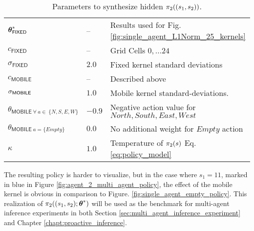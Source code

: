 \begin{table}[H]
	\centering
	\begin{tabular}{l|l l}
		$\boldsymbol{\mathbb{\theta}}^*_{\mathsf{FIXED}}$ & -- & Results used for Fig. \ref{fig:single_agent_L1Norm_25_kernels} \\
		$c_{\mathsf{FIXED}}$ & -- & Grid Cells $0,\ldots 24$ \\
		$\sigma_{\mathsf{FIXED}}$ & $2.0$ & Fixed kernel standard deviations\\
		$c_{\mathsf{MOBILE}}$ & -- & Described above \\
		$\sigma_{\mathsf{MOBILE}}$ & $\mathbf{1.0}$ & Mobile kernel standard-deviations.\\
		$\theta_{\mathsf{MOBILE}\ \forall\ a \in\ \{N,S,E,W\}}$ & $-0.9$  & Negative action value for ${North, South, East, West}$\\
		$\theta_{\mathsf{MOBILE}\ a = \{Empty\}}$ & $0.0$  & No additional weight for $Empty$ action \\
		$\kappa$ & $1.0$ & Temperature of $\pi_{2}(s)$ Eq.\ref{eq:policy_model} \\
	\end{tabular}
	\caption{Parameters to synthesize hidden $\pi_{2}((s_1,s_2))$.}
	\label{table:true_multi_agent_2_policy}
\end{table}

The resulting policy is harder to visualize, but in the case where $s_1=11$, marked in blue in Figure \ref{fig:agent_2_multi_agent_policy}, the effect of the mobile kernel is obvious in comparison to Figure. \ref{fig:single_agent_empty_policy}. This realization of $\pi_{2}((s_1,s_2);\boldsymbol{\mathbb{\theta}}^*)$ will be used as the benchmark for multi-agent inference experiments in both Section \ref{sec:multi_agent_inference_experiment} and Chapter \ref{chapt:proactive_inference}.

    \begin{figure}[htb]
	\begin{center}
	\end{center}
\end{figure}



